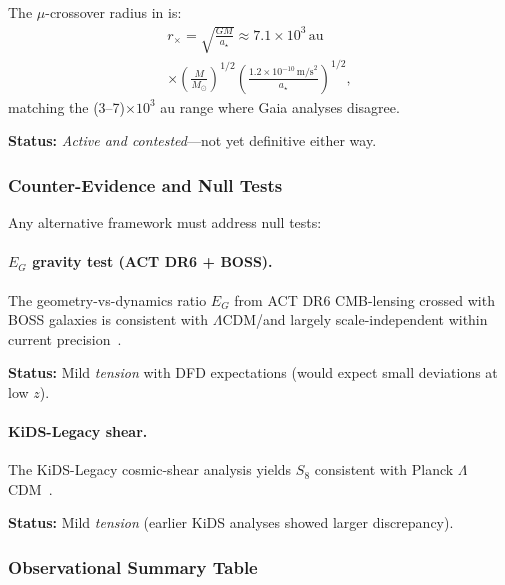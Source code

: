 The $\mu$-crossover radius in \DFD is:
\begin{multline}
r_\times = \sqrt{\frac{GM}{a_\star}} \approx 7.1 \times 10^3\,\text{au} \\
\times \left(\frac{M}{M_\odot}\right)^{1/2}
\left(\frac{1.2 \times 10^{-10}\,\text{m/s}^2}{a_\star}\right)^{1/2},
\end{multline}
matching the (3--7)$\times 10^3$ au range where Gaia analyses disagree.

\textbf{Status:} \textit{Active and contested}---not yet definitive either way.

\subsubsection{Counter-Evidence and Null Tests}

Any alternative framework must address null tests:

\paragraph{$E_G$ gravity test (ACT DR6 + BOSS).}
The geometry-vs-dynamics ratio $E_G$ from ACT DR6 CMB-lensing crossed with 
BOSS galaxies is consistent with $\Lambda$CDM/\GR and largely scale-independent 
within current precision~\cite{ACT2025EG}.

\textbf{Status:} Mild \textit{tension} with DFD expectations (would expect 
small deviations at low $z$).

\paragraph{KiDS-Legacy shear.}
The KiDS-Legacy cosmic-shear analysis yields $S_8$ consistent with Planck 
$\Lambda$CDM~\cite{KiDS2025Legacy}.

\textbf{Status:} Mild \textit{tension} (earlier KiDS analyses showed larger 
discrepancy).

\subsubsection{Observational Summary Table}

